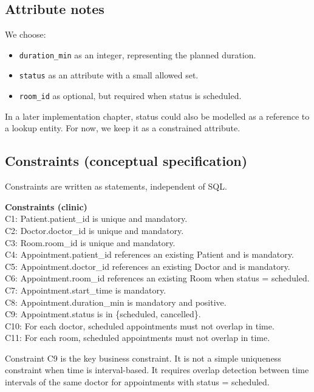 \subsection{Attribute notes}
We choose:
\begin{itemize}
  \item \texttt{duration\_min} as an integer, representing the planned duration.
  \item \texttt{status} as an attribute with a small allowed set.
  \item \texttt{room\_id} as optional, but required when status is scheduled.
\end{itemize}

In a later implementation chapter, status could also be modelled as a reference to a  lookup entity.
For now, we keep it as a constrained attribute.

\subsection{Constraints (conceptual specification)}
Constraints are written as statements, independent of SQL.

\begin{examplebox}
\textbf{Constraints (clinic)}\\
C1: Patient.patient\_id is unique and mandatory.\\
C2: Doctor.doctor\_id is unique and mandatory.\\
C3: Room.room\_id is unique and mandatory.\\
C4: Appointment.patient\_id references an existing Patient and is mandatory.\\
C5: Appointment.doctor\_id references an existing Doctor and is mandatory.\\
C6: Appointment.room\_id references an existing Room when status = scheduled.\\
C7: Appointment.start\_time is mandatory.\\
C8: Appointment.duration\_min is mandatory and positive.\\
C9: Appointment.status is in \{scheduled, cancelled\}.\\
C10: For each doctor, scheduled appointments must not overlap in time.\\
C11: For each room, scheduled appointments must not overlap in time.
\end{examplebox}

Constraint C9 is the key business constraint.
It is not a simple uniqueness constraint when time is interval-based.
It requires overlap detection between time intervals of the same doctor for appointments with status = scheduled.


